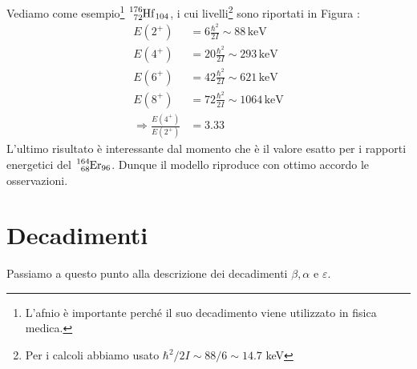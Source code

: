 \noindent Vediamo come esempio\footnote{L'afnio è importante perché il suo decadimento viene utilizzato in fisica medica.} $\ce{^{176}_{72}Hf_{104}}$, i cui livelli\footnote{Per i calcoli abbiamo usato $\hbar^2/2I \sim 88/6 \sim 14.7$ keV} sono riportati in Figura :
\begin{displaymath}
\begin{aligned}
E(2^+)&= 6\frac{\hbar^2}{2I}\sim 88\, \mbox{keV} \\
E(4^+)&= 20\frac{\hbar^2}{2I}\sim 293\, \mbox{keV} \\
E(6^+)&= 42\frac{\hbar^2}{2I}\sim 621\, \mbox{keV} \\
E(8^+)&= 72\frac{\hbar^2}{2I}\sim 1064\, \mbox{keV} \\
\Rightarrow \frac{E(4^+)}{E(2^+)}&= 3.33
\end{aligned}
\end{displaymath}
L'ultimo risultato è interessante dal momento che è il valore esatto per i rapporti energetici del $\ce{^{164}_{68}Er_{96}}$. Dunque il modello riproduce con ottimo accordo le osservazioni.

\chapter{Decadimenti}
Passiamo a questo punto alla descrizione dei decadimenti $\beta,\alpha$ e $\varepsilon$.
